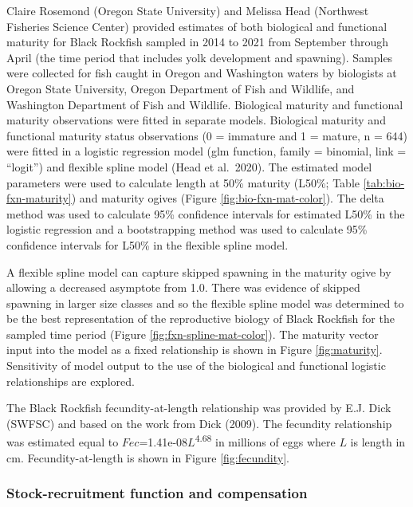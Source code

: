 \documentclass[11pt,
  english,
  letterpaper,
]{article}
\begin{document}
Claire Rosemond (Oregon State University) and Melissa Head (Northwest Fisheries Science Center) provided estimates of both biological and functional maturity for Black Rockfish sampled in 2014 to 2021 from September through April (the time period that includes yolk development and spawning). Samples were collected for fish caught in Oregon and Washington waters by biologists at Oregon State University, Oregon Department of Fish and Wildlife, and Washington Department of Fish and Wildlife. Biological maturity and functional maturity observations were fitted in separate models. Biological maturity and functional maturity status observations (0 = immature and 1 = mature, n = 644) were fitted in a logistic regression model (glm function, family = binomial, link = ``logit'') and flexible spline model (Head et al.~2020). The estimated model parameters were used to calculate length at 50\% maturity (L50\%; Table \ref{tab:bio-fxn-maturity}) and maturity ogives (Figure \ref{fig:bio-fxn-mat-color}). The delta method was used to calculate 95\% confidence intervals for estimated L50\% in the logistic regression and a bootstrapping method was used to calculate 95\% confidence intervals for L50\% in the flexible spline model.

A flexible spline model can capture skipped spawning in the maturity ogive by allowing a decreased asymptote from 1.0. There was evidence of skipped spawning in larger size classes and so the flexible spline model was determined to be the best representation of the reproductive biology of Black Rockfish for the sampled time period (Figure \ref{fig:fxn-spline-mat-color}). The maturity vector input into the model as a fixed relationship is shown in Figure \ref{fig:maturity}. Sensitivity of model output to the use of the biological and functional logistic relationships are explored.

The Black Rockfish fecundity-at-length relationship was provided by E.J. Dick (SWFSC) and based on the work from Dick (2009). The fecundity relationship was estimated equal to \(Fec\)=1.41e-08\(L\)\textsuperscript{4.68} in millions of eggs where \(L\) is length in cm. Fecundity-at-length is shown in Figure \ref{fig:fecundity}.

\hypertarget{stock-recruitment-function-and-compensation}{%
\subsubsection{Stock-recruitment function and compensation}\label{stock-recruitment-function-and-compensation}}
\end{document}
